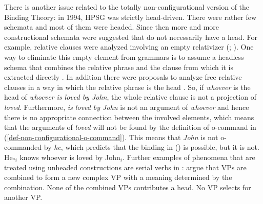 \documentclass[output=paper,biblatex,babelshorthands,newtxmath,draftmode,colorlinks,citecolor=brown]{langscibook}
\begin{document}
There is another issue related to the totally non-configurational version of the Binding Theory: in 1994, HPSG was strictly
head-driven. There were rather few schemata and most of them were headed. Since then more and more
constructional schemata were suggested that do not necessarily have a head. For example, relative
clauses were analyzed involving an empty relativizer (\citealp[Chapter~5]{ps2}; ). One way to eliminate this empty element from
grammars is to assume a headless schema that combines the relative phrase and the clause from which
it is extracted directly \parencites[Section~2.7]{Mueller99b}[522]{Sag:10b}[]{MuellerCurrentApproaches}. In addition there were proposals to analyze free
relative clauses in a way in which the relative phrase is the head
\citep[]{WK2003a}. So, if \emph{whoever} is the head of \emph{whoever is loved by John}, the whole
relative clause is not a projection of \emph{loved}. Furthermore, \emph{is loved by John} is not an argument
of \emph{whoever} and hence there is no appropriate connection between the involved elements, which
means that the arguments of \emph{loved} will not be found by the definition of o-command in
(\ref{def-non-configurational-o-command}). This means that \emph{John} is not o-commanded by
\emph{he}, which predicts that the binding in () is possible, but it is not. 
\ea
He$_{*i}$ knows whoever is loved by John$_i$.
\z
Further examples of phenomena that are treated using unheaded constructions are serial verbs in
: \citet{ML2009a} argue that VPs are combined to form a new complex VP with a
meaning determined by the combination. None of the combined VPs contributes a head. No VP selects
for another VP. 

\end{document}
